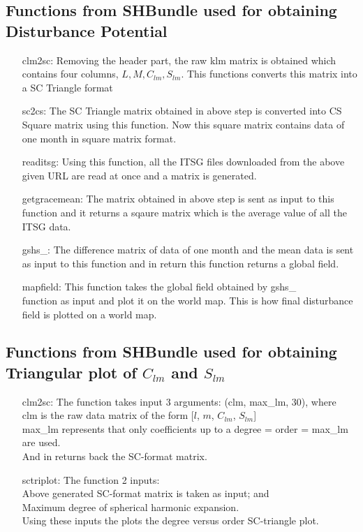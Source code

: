 \documentclass[a4paper,12pt]{report}
\begin{document}
\subsection{Functions from SHBundle used for obtaining \\Disturbance Potential}
\begin{itemize}
	\item[clm2sc: ] Removing the header part, the raw 			klm matrix is obtained which contains four columns, $L, 	M, C_{lm}, S_{lm}$. This functions converts this matrix 	into a SC Triangle format
	
	\item[sc2cs: ]The SC Triangle matrix obtained in 			above step is converted into CS Square matrix using 			this function. Now this square matrix contains data of 			one month in square matrix format.
	
	\item[readitsg: ]Using this function, all the ITSG 	files downloaded from the above given URL are read at 			once and a matrix is generated.
	
	\item[getgracemean: ]The matrix obtained in above 			step is sent as input to this function and it returns a 	sqaure matrix which is the average value of all the 			ITSG data.
	
	\item[gshs\_: ]The difference matrix of data of 			one month and the mean data is sent as input to this 			function and in return this function returns a global 			field.
	
	\item[mapfield: ]This function takes the global 			field obtained by gshs\_\\ function as input and plot 			it on the world map. This is how final disturbance 			field is plotted on a world map.
	
\end{itemize}

\subsection{Functions from SHBundle used for obtaining \\Triangular plot of $C_{lm}$ and $S_{lm}$}
\begin{itemize}
	\item[clm2sc: ] The function takes input 3 arguments: (clm, max\_{lm}, 30), where\\clm is the raw data matrix of the form [$l$, $m$, $C_{lm}$, $S_{lm}$]\\max\_{lm} represents that only coefficients up to a degree = order = max\_lm are used. \\And in returns back the SC-format matrix.
	\item[sctriplot: ] The function 2 inputs:\\Above generated SC-format matrix is taken as input; and\\Maximum degree of spherical harmonic expansion.\\Using these inputs the plots the degree versus order SC-triangle plot.
\end{itemize}
\end{document}
